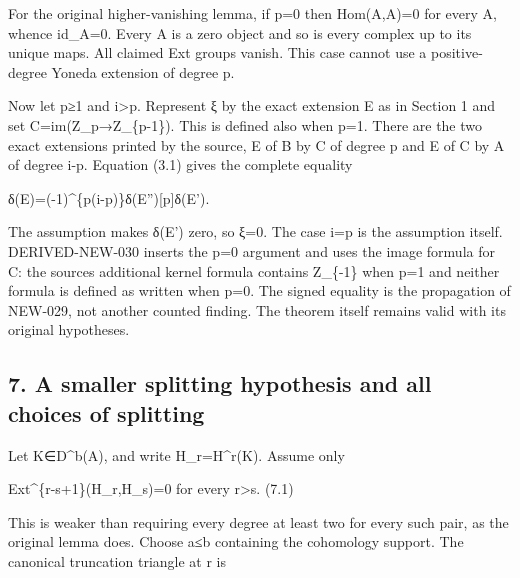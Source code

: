 For the original higher-vanishing lemma,\allowbreak{} if p\allowbreak{}=0 then Hom(A,\allowbreak{}A)\allowbreak{}\allowbreak{}=0 for every A,\allowbreak{} whence id\_\allowbreak{}A\allowbreak{}=0. Every A is a zero object and so is every complex up to its unique maps. All claimed Ext groups vanish. This case cannot use a positive-degree Yoneda extension of degree p.

Now let p≥1 and i\textgreater p. Represent ξ by the exact extension E as in Section 1 and set C\allowbreak{}=im(Z\_\allowbreak{}p\allowbreak{}→Z\_\allowbreak{}\{p-1\})\allowbreak{}. This is defined also when p\allowbreak{}=1. There are the two exact extensions printed by the source,\allowbreak{} E\textquotesingle{} of B by C of degree p and E\textquotesingle\textquotesingle{} of C by A of degree i-p. Equation (3.1)\allowbreak{} gives the complete equality

δ(E)\allowbreak{}\allowbreak{}=(-1)\allowbreak{}\textasciicircum{}\{p(i-p)\allowbreak{}\}δ(E'')\allowbreak{}[p]\allowbreak{}δ(E')\allowbreak{}.

The assumption makes δ(E')\allowbreak{} zero,\allowbreak{} so ξ\allowbreak{}=0. The case i\allowbreak{}=p is the assumption itself. DERIVED-NEW-030 inserts the p\allowbreak{}=0 argument and uses the image formula for C:\allowbreak{} the source\textquotesingle s additional kernel formula contains Z\_\allowbreak{}\{-1\} when p\allowbreak{}=1 and neither formula is defined as written when p\allowbreak{}=0. The signed equality is the propagation of NEW-029,\allowbreak{} not another counted finding. The theorem itself remains valid with its original hypotheses.

\subsection{7. A smaller splitting hypothesis and all choices of splitting}\label{proofs-8774-9196-a-smaller-splitting-hypothesis-and-all-choices-of-splitting}

Let K\allowbreak{}∈D\textasciicircum{}b(A)\allowbreak{},\allowbreak{} and write H\_\allowbreak{}r\allowbreak{}=H\textasciicircum{}r(K)\allowbreak{}. Assume only

Ext\textasciicircum{}\{r-s\allowbreak{}+1\}(H\_\allowbreak{}r,\allowbreak{}H\_\allowbreak{}s)\allowbreak{}\allowbreak{}=0 for every r\textgreater s. (7.1)\allowbreak{}

This is weaker than requiring every degree at least two for every such pair,\allowbreak{} as the original lemma does. Choose a≤b containing the cohomology support. The canonical truncation triangle at r is

